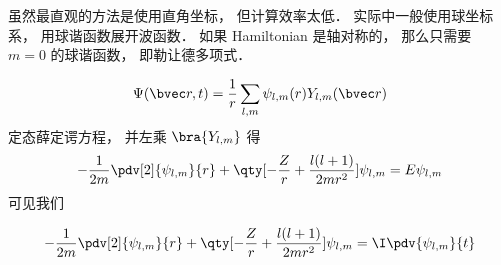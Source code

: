 
虽然最直观的方法是使用直角坐标， 但计算效率太低． 实际中一般使用球坐标系， 用球谐函数展开波函数． 如果 Hamiltonian 是轴对称的， 那么只需要 $m = 0$ 的球谐函数， 即勒让德多项式．

\begin{equation}
\Psi(\bvec r, t) = \frac{1}{r}\sum_{l,m} \psi_{l,m}(r) Y_{l,m}(\bvec r)
\end{equation}
定态薛定谔方程， 并左乘 $\bra{Y_{l,m}}$ 得
\begin{equation}
-\frac{1}{2m} \pdv[2]{\psi_{l,m}}{r} + \qty[-\frac{Z}{r} + \frac{l(l+1)}{2mr^2}]\psi_{l,m} = E \psi_{l,m}
\end{equation}
可见我们


\begin{equation}
-\frac{1}{2m} \pdv[2]{\psi_{l,m}}{r} + \qty[-\frac{Z}{r} + \frac{l(l+1)}{2mr^2}]\psi_{l,m} = \I \pdv{\psi_{l,m}}{t}
\end{equation}

